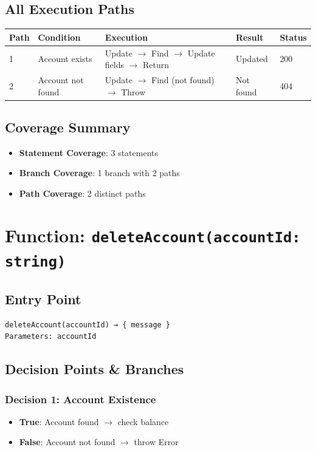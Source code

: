 \subsection{All Execution Paths}

\begin{longtable}{|L{0.8cm}|L{3cm}|L{5.5cm}|L{2.5cm}|L{1.2cm}|}
\hline
\textbf{Path} & \textbf{Condition} & \textbf{Execution} & \textbf{Result} & \textbf{Status} \\
 & Account exists & Update $\rightarrow$ Find $\rightarrow$ Update fields $\rightarrow$ Return & Updated & 200 \\
 & Account not found & Update $\rightarrow$ Find (not found) $\rightarrow$ Throw & Not found & 404 \\
\hline
\end{longtable}

\subsection{Coverage Summary}
\begin{itemize}
    \item \textbf{Statement Coverage}: 3 statements
    \item \textbf{Branch Coverage}: 1 branch with 2 paths
    \item \textbf{Path Coverage}: 2 distinct paths
\end{itemize}

\section{Function: \texttt{deleteAccount(accountId: string)}}

\subsection{Entry Point}
\begin{verbatim}
deleteAccount(accountId) → { message }
Parameters: accountId
\end{verbatim}

\subsection{Decision Points \& Branches}

\subsubsection{Decision 1: Account Existence}
\begin{itemize}
    \item \textbf{True}: Account found $\rightarrow$ check balance
    \item \textbf{False}: Account not found $\rightarrow$ throw Error
\end{itemize}

